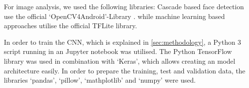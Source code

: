 For image analysis, we used the following libraries: Cascade based face
detection use the official `OpenCV4Android'-Library \cite{opencv4android}.
while machine learning based approaches utilise the official TFLite library.
\cite{tensorflow}

In order to train the CNN, which is explained in \ref{sec:methodology}, a
Python 3 script running in an Jupyter notebook was utilised. 
The Python TensorFlow library was used in combination with `Keras',
which allows creating an model architecture easily. In order to prepare the
training, test and validation data, the libraries `pandas', `pillow', 
`mathplotlib' and `numpy' were used.
